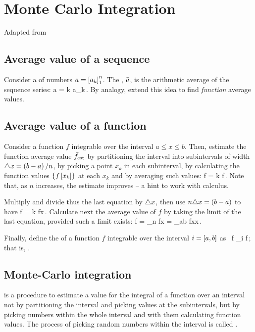 \chapter*{Monte Carlo Integration}
%
Adapted from \citep{fang:2014, amth142}


\section*{Average value of a sequence}
%
Consider a  of numbers $a = \left[{a}_{k}\right]_{1}^{n}$. The , $\bar{a}$, is the arithmetic average of the sequence series:
%
\beq
  \mean a = \ssum k a_k\,.
\eeq
%
By analogy, extend this idea to find \emph{function} average values.


\section*{Average value of a function}
%
Consider a function $f$ integrable over the interval $a\leq x\leq b$. Then, estimate the function average value $\bar{f}_\text{est}$ by partitioning the interval into subintervals of width $\triangle x = \left(b - a\right)/n$, by picking a point $x_k$ in each subinterval, by calculating the function values $\left\lbrace{f\left[{x_k}\right]}\right\rbrace$ at each $x_k$ and by averaging such values:
%
\beq
  \mean f = \ssum k f\,.
\eeq
%
Note that, as $n$ increases, the estimate improves -- a hint to work with calculus.

Multiply and divide thus the last equation by $\triangle x$, then use $n\triangle x = \left(b - a\right)$ to have
%
\beq
  \mean f = \ssum k f\Dx x\,.
\eeq
%
Calculate next the average value of $f$ by taking the limit of the last equation, provided such a limit exists:
%
\beq
  \mean f = \lim_{n\to\infty} f\Dx x
          = \int_{\ccint ab} f\vat x\dx x\,.
\eeq

Finally, define the  of a function $f$ integrable over the interval $i = \left[{a},{b}\right]$ as~
%
\beq
  \mean f  {}\int_i f\,;
\eeq
%
that is, .


\section*{Monte-Carlo integration}
%
 is a procedure to estimate a value for the integral of a function over an interval not by partitioning the interval and picking values at the subintervals, but by  picking numbers within the whole interval and with them calculating function values. The process of picking random numbers within the interval is called .

